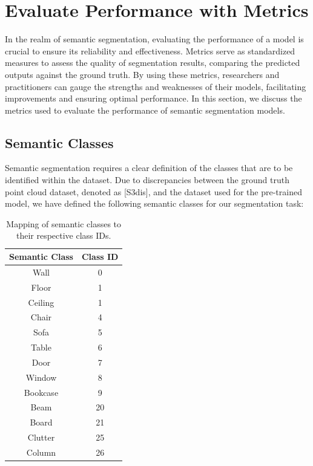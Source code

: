 \documentclass[11pt, a4paper,oneside,chapterprefix=false]{scrbook}
\begin{document}
\section{Evaluate Performance with Metrics}

In the realm of semantic segmentation, evaluating the performance of a model is crucial to ensure its reliability and effectiveness. Metrics serve as standardized measures to assess the quality of segmentation results, comparing the predicted outputs against the ground truth. By using these metrics, researchers and practitioners can gauge the strengths and weaknesses of their models, facilitating improvements and ensuring optimal performance. In this section, we discuss the metrics used to evaluate the performance of semantic segmentation models.

\subsection{Semantic Classes}

Semantic segmentation requires a clear definition of the classes that are to be identified within the dataset. Due to discrepancies between the ground truth point cloud dataset, denoted as [S3dis], and the dataset used for the pre-trained model, we have defined the following semantic classes for our segmentation task:

\begin{table}[h]
    \centering
    \begin{tabular}{|c|c|}
        \hline
        \textbf{Semantic Class} & \textbf{Class ID} \\
        \hline
        Wall & 0 \\
        Floor & 1 \\
        Ceiling & 1 \\
        Chair & 4 \\
        Sofa & 5 \\
        Table & 6 \\
        Door & 7 \\
        Window & 8 \\
        Bookcase & 9 \\
        Beam & 20 \\
        Board & 21 \\
        Clutter & 25 \\
        Column & 26 \\
        \hline
    \end{tabular}
    \caption{Mapping of semantic classes to their respective class IDs.}
    \label{tab:semantic_classes}
\end{table}
\end{document}
